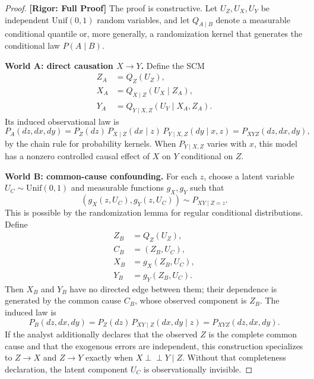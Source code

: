 \documentclass[11pt,a4paper]{article}
\theoremstyle{definition}
\newcommand{\rigorFull}{\textbf{[Rigor: Full Proof]}}
\begin{document}
\begin{proof}
\rigorFull
The proof is constructive.  Let $U_Z,U_X,U_Y$ be independent
$\mathrm{Unif}(0,1)$ random variables, and let
$Q_{A\mid B}$ denote a measurable conditional quantile or, more generally,
a randomization kernel that generates the conditional law $P(A\mid B)$.

\medskip\noindent
\textbf{World A: direct causation $X \to Y$.}
Define the SCM
\begin{align}
    Z_A &= Q_Z(U_Z), \nonumber\\
    X_A &= Q_{X\mid Z}(U_X \mid Z_A), \nonumber\\
    Y_A &= Q_{Y\mid X,Z}(U_Y \mid X_A,Z_A).
    \label{eq:scm_direct}
\end{align}
Its induced observational law is
\begin{equation}
    P_A(dz,dx,dy)
    = P_Z(dz)\,P_{X\mid Z}(dx\mid z)\,P_{Y\mid X,Z}(dy\mid x,z)
    = P_{XYZ}(dz,dx,dy),
    \label{eq:direct_law}
\end{equation}
by the chain rule for probability kernels.  When
$P_{Y\mid X,Z}$ varies with $x$, this model has a nonzero controlled
causal effect of $X$ on $Y$ conditional on $Z$.

\medskip\noindent
\textbf{World B: common-cause confounding.}
For each $z$, choose a latent variable $U_C \sim \mathrm{Unif}(0,1)$ and
measurable functions $g_X,g_Y$ such that
\begin{equation}
    (g_X(z,U_C),g_Y(z,U_C)) \sim P_{XY\mid Z=z}.
    \label{eq:common_cause_kernel}
\end{equation}
This is possible by the randomization lemma for regular conditional
distributions.  Define
\begin{align}
    Z_B &= Q_Z(U_Z), \nonumber\\
    C_B &= (Z_B,U_C), \nonumber\\
    X_B &= g_X(Z_B,U_C), \nonumber\\
    Y_B &= g_Y(Z_B,U_C).
    \label{eq:scm_confounding}
\end{align}
Then $X_B$ and $Y_B$ have no directed edge between them; their dependence
is generated by the common cause $C_B$, whose observed component is $Z_B$.
The induced law is
\begin{equation}
    P_B(dz,dx,dy)
    = P_Z(dz)\,P_{XY\mid Z}(dx,dy\mid z)
    = P_{XYZ}(dz,dx,dy).
    \label{eq:confounding_law}
\end{equation}
If the analyst additionally declares that the observed $Z$ is the complete
common cause and that the exogenous errors are independent, this construction
specializes to $Z \to X$ and $Z \to Y$ exactly when
$X \perp\!\!\!\perp Y\mid Z$.  Without that completeness declaration, the
latent component $U_C$ is observationally invisible.


\end{proof}
\end{document}
